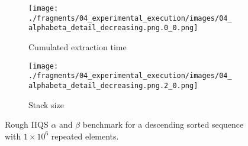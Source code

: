 \begin{figure}
    \centering
    \begin{subfigure}[b]{0.45\textwidth}
        \centering
        \texttt{[image: ./fragments/04\_experimental\_execution/images/04\_alphabeta\_detail\_decreasing.png.0\_0.png]}
        \caption{Cumulated extraction time}
        \label{FIG:05_ALPHABETA_BENCHMARK_DESC__0_0}
    \end{subfigure}
    \begin{subfigure}[b]{0.45\textwidth}
        \centering
        \texttt{[image: ./fragments/04\_experimental\_execution/images/04\_alphabeta\_detail\_decreasing.png.2\_0.png]}
        \caption{Stack size}
        \label{FIG:05_ALPHABETA_BENCHMARK_DESC__0_1}
    \end{subfigure}



    
    \caption{Rough IIQS $\alpha$ and $\beta$ benchmark for a descending sorted sequence with $1\times10^6$ repeated elements.}
    \label{FIG:05_ALPHABETA_BENCHMARK_DESC}
\end{figure}


